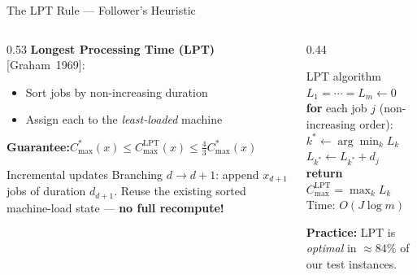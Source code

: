 \documentclass[fleqn,11pt,aspectratio=43]{beamer}
\newcommand{\Copt}{C_{\max}^{*}}
\newcommand{\Clpt}{C_{\max}^{\mathrm{LPT}}}
\begin{document}
\begin{frame}[shrink=5]{The LPT Rule — Follower's Heuristic}
  \begin{columns}[T]
    \begin{column}{0.53\textwidth}
      \textbf{Longest Processing Time (LPT)} [Graham~1969]:
      \begin{itemize}
        \item Sort jobs by non-increasing duration
        \item Assign each to the \emph{least-loaded} machine
      \end{itemize}
      \textbf{Guarantee:}\quad $\Copt(x)\leq\Clpt(x)\leq\tfrac{4}{3}\Copt(x)$
      \begin{alertblock}{Incremental updates}
        Branching $d\to d{+}1$: append $x_{d+1}$ jobs of duration $d_{d+1}$.
        Reuse the existing sorted machine-load state — \textbf{no full recompute!}
      \end{alertblock}
    \end{column}
    \begin{column}{0.44\textwidth}
      \begin{block}{LPT algorithm}
        \footnotesize
        $L_1=\cdots=L_m\leftarrow 0$\\[0.15em]
        \textbf{for} each job $j$ (non-increasing order):\\
        \quad $k^*\leftarrow\arg\min_k L_k$\\
        \quad $L_{k^*}\leftarrow L_{k^*}+d_j$\\[0.15em]
        \textbf{return} $\Clpt=\max_k L_k$\\[0.2em]
        \normalsize Time: $O(J\log m)$
      \end{block}
      \textbf{Practice:} LPT is \emph{optimal} in $\approx84\%$ of our test instances.
    \end{column}
  \end{columns}
\end{frame}
\end{document}
